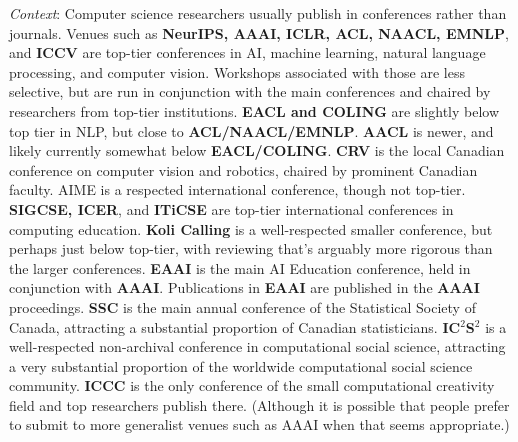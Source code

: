\documentclass[letterpaper,11pt]{article}
\begin{document}
 \textit{Context}: Computer science researchers usually publish in conferences rather than journals. Venues such as \textbf{NeurIPS, AAAI, ICLR, ACL, NAACL, EMNLP}, and \textbf{ICCV} are top-tier conferences in AI, machine learning, natural language processing, and computer vision. Workshops associated with those are less selective, but are run in conjunction with the main conferences and chaired by researchers from top-tier institutions. \textbf{EACL and COLING} are slightly below top tier in NLP, but close to \textbf{ACL/NAACL/EMNLP}. \textbf{AACL} is newer, and likely currently somewhat below \textbf{EACL/COLING}. \textbf{CRV} is the local Canadian conference on computer vision and robotics, chaired by prominent Canadian faculty. AIME is a respected international conference, though not top-tier. \textbf{SIGCSE, ICER}, and \textbf{ITiCSE} are top-tier international conferences in computing education. \textbf{Koli Calling} is a well-respected smaller conference, but perhaps just below top-tier, with reviewing that's arguably more rigorous than the larger conferences. \textbf{EAAI} is the main AI Education conference, held in conjunction with \textbf{AAAI}. Publications in \textbf{EAAI} are published in the \textbf{AAAI} proceedings. \textbf{SSC} is the main annual conference of the Statistical Society of Canada, attracting a substantial proportion of Canadian statisticians. \textbf{IC$^2$S$^2$} is a well-respected non-archival conference in computational social science, attracting a very substantial proportion of the worldwide computational social science community. \textbf{ICCC} is the only conference of the small computational creativity field and top researchers publish there. (Although it is possible that people prefer to submit to more generalist venues such as AAAI when that seems appropriate.)
\end{document}
